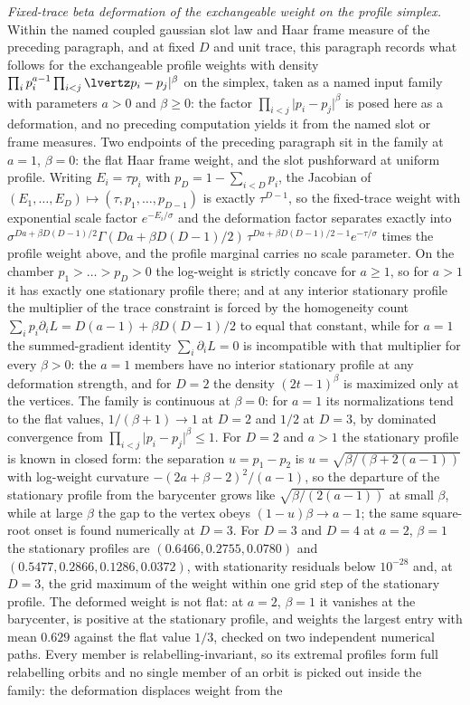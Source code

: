 \documentclass{article}
\begin{document}
\emph{Fixed-trace beta deformation of the exchangeable weight on the profile simplex.} Within the named coupled gaussian slot law and Haar frame measure of the preceding paragraph, and at fixed \(D\) and unit trace, this paragraph records what follows for the exchangeable profile weights with density \(\prod_{i}p_{i}^{a-1}\prod_{i<j}\lvertz p_{i}-p_{j}\rvert^{\beta}\) on the simplex, taken as a named input family with parameters \(a>0\) and \(\beta\ge 0\): the factor \(\prod_{i<j}\lvert p_{i}-p_{j}\rvert^{\beta}\) is posed here as a deformation, and no preceding computation yields it from the named slot or frame measures. Two endpoints of the preceding paragraph sit in the family at \(a=1\), \(\beta=0\): the flat Haar frame weight, and the slot pushforward at uniform profile. Writing \(E_{i}=\tau p_{i}\) with \(p_{D}=1-\sum_{i<D}p_{i}\), the Jacobian of \((E_{1},\dots,E_{D})\mapsto(\tau,p_{1},\dots,p_{D-1})\) is exactly \(\tau^{D-1}\), so the fixed-trace weight with exponential scale factor \(e^{-E_{i}/\sigma}\) and the deformation factor separates exactly into \(\sigma^{Da+\beta D(D-1)/2}\Gamma(Da+\beta D(D-1)/2)\,\tau^{Da+\beta D(D-1)/2-1}e^{-\tau/\sigma}\) times the profile weight above, and the profile marginal carries no scale parameter. On the chamber \(p_{1}>\dots>p_{D}>0\) the log-weight is strictly concave for \(a\ge 1\), so for \(a>1\) it has exactly one stationary profile there; and at any interior stationary profile the multiplier of the trace constraint is forced by the homogeneity count \(\sum_{i}p_{i}\partial_{i}L=D(a-1)+\beta D(D-1)/2\) to equal that constant, while for \(a=1\) the summed-gradient identity \(\sum_{i}\partial_{i}L=0\) is incompatible with that multiplier for every \(\beta>0\): the \(a=1\) members have no interior stationary profile at any deformation strength, and for \(D=2\) the density \((2t-1)^{\beta}\) is maximized only at the vertices. The family is continuous at \(\beta=0\): for \(a=1\) its normalizations tend to the flat values, \(1/(\beta+1)\to 1\) at \(D=2\) and \(1/2\) at \(D=3\), by dominated convergence from \(\prod_{i<j}\lvert p_{i}-p_{j}\rvert^{\beta}\le 1\). For \(D=2\) and \(a>1\) the stationary profile is known in closed form: the separation \(u=p_{1}-p_{2}\) is \(u=\sqrt{\beta/(\beta+2(a-1))}\) with log-weight curvature \(-(2a+\beta-2)^{2}/(a-1)\), so the departure of the stationary profile from the barycenter grows like \(\sqrt{\beta/(2(a-1))}\) at small \(\beta\), while at large \(\beta\) the gap to the vertex obeys \((1-u)\beta\to a-1\); the same square-root onset is found numerically at \(D=3\). For \(D=3\) and \(D=4\) at \(a=2\), \(\beta=1\) the stationary profiles are \((0.6466,0.2755,0.0780)\) and \((0.5477,0.2866,0.1286,0.0372)\), with stationarity residuals below \(10^{-28}\) and, at \(D=3\), the grid maximum of the weight within one grid step of the stationary profile. The deformed weight is not flat: at \(a=2\), \(\beta=1\) it vanishes at the barycenter, is positive at the stationary profile, and weights the largest entry with mean \(0.629\) against the flat value \(1/3\), checked on two independent numerical paths. Every member is relabelling-invariant, so its extremal profiles form full relabelling orbits and no single member of an orbit is picked out inside the family: the deformation displaces weight from the 
\end{document}
